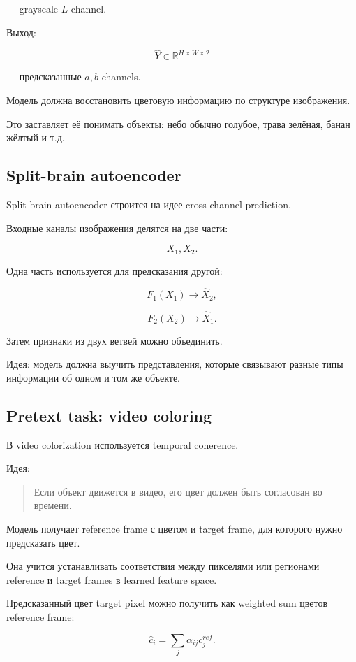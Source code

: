 \documentclass[a4paper,12pt]{article}
\begin{document}
--- grayscale \(L\)-channel.

Выход:

\[
\hat{Y} \in \mathbb{R}^{H \times W \times 2}
\]

--- предсказанные \(a,b\)-channels.

Модель должна восстановить цветовую информацию по структуре изображения.

Это заставляет её понимать объекты: небо обычно голубое, трава зелёная, банан жёлтый и т.д.

\subsection{Split-brain autoencoder}

Split-brain autoencoder строится на идее cross-channel prediction.

Входные каналы изображения делятся на две части:

\[
X_1, X_2.
\]

Одна часть используется для предсказания другой:

\[
F_1(X_1) \rightarrow \hat{X}_2,
\]

\[
F_2(X_2) \rightarrow \hat{X}_1.
\]

Затем признаки из двух ветвей можно объединить.

Идея: модель должна выучить представления, которые связывают разные типы информации об одном и том же объекте.

\subsection{Pretext task: video coloring}

В video colorization используется temporal coherence.

Идея:

\begin{quote}
Если объект движется в видео, его цвет должен быть согласован во времени.
\end{quote}

Модель получает reference frame с цветом и target frame, для которого нужно предсказать цвет.

Она учится устанавливать соответствия между пикселями или регионами reference и target frames в learned feature space.

Предсказанный цвет target pixel можно получить как weighted sum цветов reference frame:

\[
\hat{c}_i
=
\sum_j
\alpha_{ij} c_j^{ref}.
\]
\end{document}
